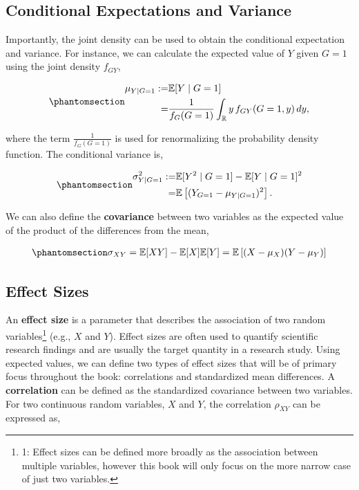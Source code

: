 \documentclass[
  letterpaper,
  DIV=11,
  numbers=noendperiod]{scrreprt}
\begin{document}
\subsection{Conditional Expectations and
Variance}\label{conditional-expectations-and-variance}

Importantly, the joint density can be used to obtain the conditional
expectation and variance. For instance, we can calculate the expected
value of \(Y\) given \(G=1\) using the joint density \(f_{GY}\),

\begin{equation}\phantomsection\label{eq-cond-mean}{\begin{align}
\mu_{Y|G=1} :=& \mathbb{E}\lbrack Y \mid G=1\rbrack \\=& \frac{1}{f_G(G=1)}\int_{\mathbb{R}} y\, f_{GY}(G=1,y) \, dy,
\end{align}}\end{equation}

where the term \(\frac{1}{f_G(G=1)}\) is used for renormalizing the
probability density function. The conditional variance is,

\begin{equation}\phantomsection\label{eq-cond-var}{\begin{align}
\sigma^2_{Y|G=1} :=& \mathbb{E}\lbrack Y^2 \mid G=1\rbrack - \mathbb{E}\lbrack Y \mid G=1\rbrack^2\\ =& \mathbb{E}\left[(Y_{G=1}-\mu_{Y|G=1})^2\right].
\end{align}}\end{equation}

We can also define the \textbf{covariance} between two variables as the
expected value of the product of the differences from the mean,

\begin{equation}\phantomsection\label{eq-cov}{\begin{align}
\sigma_{XY} = \mathbb{E}\lbrack XY \rbrack - \mathbb{E}\lbrack X\rbrack\mathbb{E}\lbrack Y\rbrack = \mathbb{E}\left[(X-\mu_X)(Y-\mu_Y)\right]
\end{align}}\end{equation}

\subsection{Effect Sizes}\label{effect-sizes}

An \textbf{effect size} is a parameter that describes the association of
two random variables\footnote{1: Effect sizes can be defined more
  broadly as the association between multiple variables, however this
  book will only focus on the more narrow case of just two variables.}
(e.g., \(X\) and \(Y\)). Effect sizes are often used to quantify
scientific research findings and are usually the target quantity in a
research study. Using expected values, we can define two types of effect
sizes that will be of primary focus throughout the book: correlations
and standardized mean differences. A \textbf{correlation} can be defined
as the standardized covariance between two variables. For two continuous
random variables, \(X\) and \(Y\), the correlation \(\rho_{XY}\) can be
expressed as,
\end{document}
